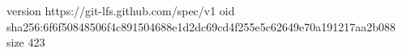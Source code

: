 version https://git-lfs.github.com/spec/v1
oid sha256:6f6f50848506f4c891504688e1d2dc69cd4f255e5c62649e70a191217aa2b088
size 423
